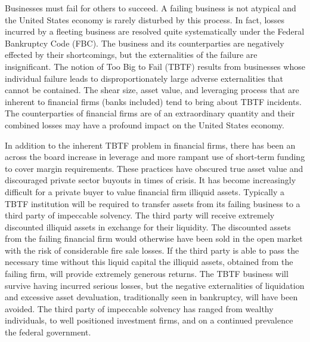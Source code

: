 \setcounter{page}{1}


Businesses must fail for others to succeed.  A failing business is not atypical and the United States economy is rarely disturbed by this process.  In fact, losses incurred by a fleeting business are resolved quite systematically under the Federal Bankruptcy Code (FBC).  The business and its counterparties are negatively effected by their shortcomings, but the externalities of the failure are insignificant.\cite{Kaufman}  The notion of Too Big to Fail (TBTF) results from businesses whose individual failure leads to disproportionately large adverse externalities that cannot be contained.\cite{Zhuo}  The shear size, asset value, and leveraging process that are inherent to financial firms (banks included) tend to bring about TBTF incidents.  The counterparties of financial firms are of an extraordinary quantity and their combined losses may have a profound impact on the United States economy.  


In addition to the inherent TBTF problem in financial firms, there has been an across the board increase in leverage and more rampant use of short-term funding to cover margin requirements.  These practices have obscured true asset value and discouraged private sector buyouts in times of crisis.\cite{Kunt}   It has become increasingly difficult for a private buyer to value financial firm illiquid assets.  Typically a TBTF institution will be required to transfer assets from its failing business to a third party of impeccable solvency.  The third party will receive extremely discounted illiquid assets in exchange for their liquidity.  The discounted assets from the failing financial firm would otherwise have been sold in the open market with the risk of considerable fire sale losses.\cite{Kaufman}  If the third party is able to pass the necessary time without this liquid capital the illiquid assets, obtained from the failing firm, will provide extremely generous returns.  The TBTF business will survive having incurred serious losses, but the negative externalities of liquidation and excessive asset devaluation, traditionally seen in bankruptcy, will have been avoided.  The third party of impeccable solvency has ranged from wealthy individuals, to well positioned investment firms, and on a continued prevalence the federal government.  


